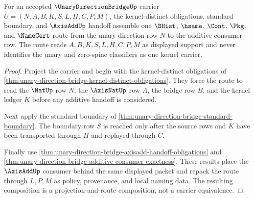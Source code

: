 \begin{theorem}
\label{thm:unary-direction-bridge-kernel-axis-composition}
For an accepted $\UnaryDirectionBridgeUp$ carrier $U=(N,A,B,K,S,L,H,C,P,M)$, the kernel-distinct obligations, standard boundary, and $\AxisAddUp$ handoff assemble one $\BHist$, $\hsame$, $\Cont$, $\Pkg$, and $\NameCert$ route from the unary direction row $N$ to the additive consumer row. The route reads $A,B,K,S,L,H,C,P,M$ as displayed support and never identifies the unary and zero-spine classifiers as one kernel carrier.
\end{theorem}
\begin{proof}
Project the carrier and begin with the kernel-distinct obligations of \autoref{thm:unary-direction-bridge-kernel-distinct-obligations}. They force the route to read the $\NatUp$ row $N$, the $\AxisNatUp$ row $A$, the bridge row $B$, and the kernel ledger $K$ before any additive handoff is considered.

Next apply the standard boundary of \autoref{thm:unary-direction-bridge-standard-boundary}. The boundary row $S$ is reached only after the source rows and $K$ have been transported through $H$ and replayed through $C$.

Finally use \autoref{thm:unary-direction-bridge-axisadd-handoff-obligations} and \autoref{thm:unary-direction-bridge-additive-consumer-exactness}. These results place the $\AxisAddUp$ consumer behind the same displayed packet and repack the route through $L,P,M$ as policy, provenance, and local naming data. The resulting composition is a projection-and-route composition, not a carrier equivalence.
\end{proof}

